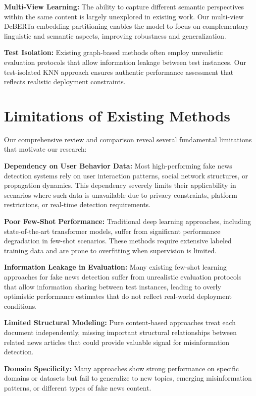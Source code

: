 \textbf{Multi-View Learning:} The ability to capture different semantic perspectives within the same content is largely unexplored in existing work. Our multi-view DeBERTa embedding partitioning enables the model to focus on complementary linguistic and semantic aspects, improving robustness and generalization.

\textbf{Test Isolation:} Existing graph-based methods often employ unrealistic evaluation protocols that allow information leakage between test instances. Our test-isolated KNN approach ensures authentic performance assessment that reflects realistic deployment constraints.

\section{Limitations of Existing Methods}

Our comprehensive review and comparison reveal several fundamental limitations that motivate our research:

\textbf{Dependency on User Behavior Data:} Most high-performing fake news detection systems rely on user interaction patterns, social network structures, or propagation dynamics. This dependency severely limits their applicability in scenarios where such data is unavailable due to privacy constraints, platform restrictions, or real-time detection requirements.

\textbf{Poor Few-Shot Performance:} Traditional deep learning approaches, including state-of-the-art transformer models, suffer from significant performance degradation in few-shot scenarios. These methods require extensive labeled training data and are prone to overfitting when supervision is limited.

\textbf{Information Leakage in Evaluation:} Many existing few-shot learning approaches for fake news detection suffer from unrealistic evaluation protocols that allow information sharing between test instances, leading to overly optimistic performance estimates that do not reflect real-world deployment conditions.

\textbf{Limited Structural Modeling:} Pure content-based approaches treat each document independently, missing important structural relationships between related news articles that could provide valuable signal for misinformation detection.

\textbf{Domain Specificity:} Many approaches show strong performance on specific domains or datasets but fail to generalize to new topics, emerging misinformation patterns, or different types of fake news content.


